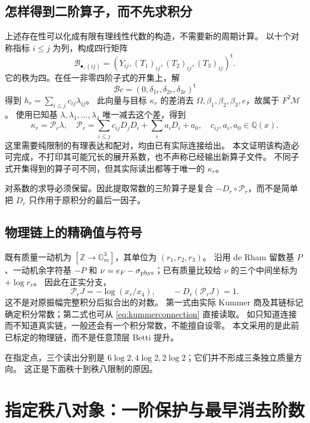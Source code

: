 \documentclass[11pt,a4paper]{ctexart}
\theoremstyle{cnplain}
\theoremstyle{definition}
\theoremstyle{remark}
\newcommand{\Q}{\mathbb Q}
\newcommand{\cM}{\mathcal M}
\begin{document}
\subsection{怎样得到二阶算子，而不先求积分}
上述存在性可以化成有限有理线性代数的构造，不需要新的周期计算。
以十个对称指标 $i\le j$ 为列，构成四行矩阵
\begin{equation}\label{eq:Bmatrix}
 \mathcal B_{\bullet,(ij)}=
 (Y_{ij},(T_1)_{ij},(T_2)_{ij},(T_3)_{ij})^{\mathsf t}.
\end{equation}
它的秩为四。在任一非零四阶子式的开集上，解
\[
 \mathcal Bc=(0,\delta_{1r},\delta_{2r},\delta_{3r})^{\mathsf t}
\]
得到 $h_r=\sum_{i\le j}c_{ij}\lambda_{ij}$。
此向量与目标 $\kappa_r$ 的差消去 $\Omega,\beta_1,\beta_2,\beta_3,e$，故属于 $F^2\cM$。
使用已知基 $\lambda,\lambda_1,\ldots,\lambda_4$ 唯一减去这个差，得到
\begin{equation}\label{eq:operator}
 \kappa_r=\mathscr P_r\lambda,
 \quad\mathscr P_r=
 \sum_{i\le j}c_{ij}D_jD_i+\sum_i a_iD_i+a_0,
 \quad c_{ij},a_i,a_0\in\Q(x).
\end{equation}
这里需要纯限制的有理表达和配对，均由已有实际连接给出。
本文证明该构造必可完成，不打印其可能冗长的展开系数，也不声称已经输出新算子文件。
不同子式开集得到的算子可不同，但其实际读出都等于唯一的 $\kappa_r$。

对系数的求导必须保留。因此提取常数的三阶算子是复合
$-D_r\circ\mathscr P_r$，而不是简单把 $D_r$ 只作用于原积分的最后一因子。

\subsection{物理链上的精确值与符号}
既有质量一动机为 $[\mathbb Z\to\mathbb G_m^3]$，其单位为 $(r_1,r_2,r_3)$。
沿用 de Rham 留数基 $P$、一动机余字符基 $-P$ 和
$\nu=e_F-\sigma_{\rm phys}$；已有质量比较给
$\nu$ 的三个中间坐标为 $+\log r_r$。
因此在正实分支，
\begin{equation}\label{eq:physicalextract}
 \boxed{\mathscr P_rJ=-\log(x_r/x_4),\qquad
       -D_r(\mathscr P_rJ)=1.}
\end{equation}
这不是对原振幅完整积分后拟合出的对数。
第一式由实际 Kummer 商及其链标记确定积分常数；第二式也可从 \eqref{eq:kummerconnection} 直接读取。
如只知道连接而不知道真实链，一般还会有一个积分常数，不能擅自设零。
本文采用的是此前已标定的物理链，而不是任意顶层 Betti 提升。

在指定点，三个读出分别是 $6\log2,4\log2,2\log2$；它们并不形成三条独立质量方向。
这正是下面秩十到秩八限制的原因。

\section{指定秩八对象：一阶保护与最早消去阶数}
\end{document}
